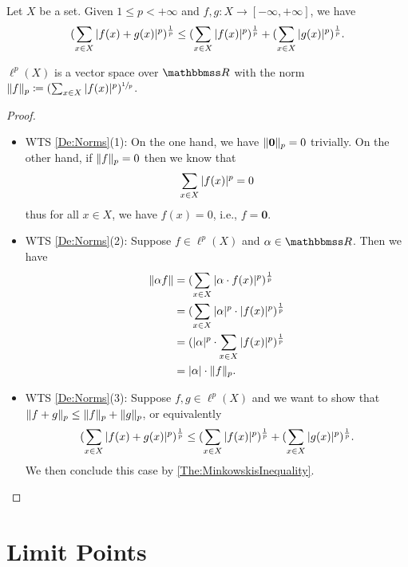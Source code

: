 \documentclass[screen,single]{techreport}
\numberwithin{equation}{section}
\begin{document}
\begin{theorem}\label{The:MinkowskisInequality}
	Let $X$ be a set.
	Given $1 \le p < +\infty$ and $f,g:X \to [-\infty,+\infty]$, we have
	\begin{equation*}
		({ \sum_{x \in X} |{f(x)+g(x)}|^p })^{\frac{1}{p}} \le ({ \sum_{x \in X} |{f(x)}|^p })^{\frac{1}{p}} + ({ \sum_{x \in X} |{g(x)}|^p })^{\frac{1}{p}}.
	\end{equation*}
\end{theorem}

\begin{proposition}\label{Prop:lpVectorSpace}
	$\ell^p(X)$ is a vector space over $\bbR$ with the norm $\|{f}\|_p \coloneqq  ({\sum_{x \in X} |{f(x)}|^p})^{\sfrac{1}{p}}$.
\end{proposition}
\begin{proof}\
	\begin{itemize}
		\item WTS \cref{De:Norms}(1):
		On the one hand, we have $\|{\mathbf{0}}\|_p = 0$ trivially.
		On the other hand, if $\|{f}\|_p = 0$ then we know that
		\[
		\sum_{x \in X} |{f(x)}|^p = 0
		\]
		thus for all $x \in X$, we have $f(x) = 0$, i.e., $f = \mathbf{0}$.
		
		\item WTS \cref{De:Norms}(2): Suppose $f \in \ell^p(X)$ and $\alpha \in \bbR$.
		Then we have
		\begin{align*}
			\|{\alpha f}\| & = ({\sum_{x \in X} |{\alpha \cdot f(x)}|^p})^{\frac{1}{p}} \\
			& = ({ \sum_{x \in X} |{\alpha}|^p \cdot |{f(x)}|^p})^\frac{1}{p} \\
			& = ({ |{\alpha}|^p \cdot \sum_{x \in X} |{f(x)}|^p })^\frac{1}{p} \\
			& = |{\alpha}| \cdot \|{f}\|_p.
		\end{align*}
		
		\item WTS \cref{De:Norms}(3): Suppose $f,g \in \ell^p(X)$ and we want to show that $\|{f+g}\|_p \le \|{f}\|_p+\|{g}\|_p$, or equivalently
		\[
		({ \sum_{x \in X} |{f(x) + g(x)}|^p })^\frac{1}{p} \le ({ \sum_{x \in X} |{f(x)}|^p})^\frac{1}{p} + ({ \sum_{x \in X} |{g(x)}|^p})^\frac{1}{p}.
		\]
		We then conclude this case by \cref{The:MinkowskisInequality}.
	\end{itemize}
\end{proof}

\section{Limit Points}
\end{document}
